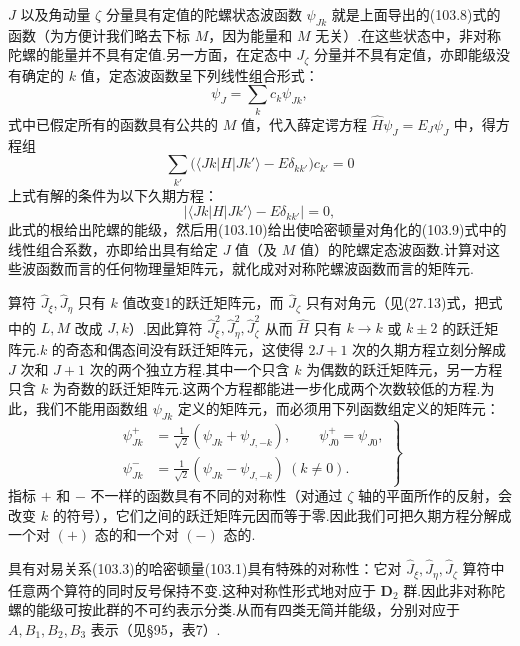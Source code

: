 $J$ 以及角动量 $\zeta$ 分量具有定值的陀螺状态波函数 $\psi_{Jk}$ 就是上面导出的(103.8)式的函数（为方便计我们略去下标 $M$，因为能量和 $M$ 无关）.在这些状态中，非对称陀螺的能量并不具有定值.另一方面，在定态中 $J_\zeta$ 分量并不具有定值，亦即能级没有确定的 $k$ 值，定态波函数呈下列线性组合形式：
\begin{equation}
  \psi_J=\sum_k c_k\psi_{Jk},
\end{equation}
式中已假定所有的函数具有公共的 $M$ 值，代入薛定谔方程 $\hat{H}\psi_J=E_J\psi_J$ 中，得方程组
\begin{equation}
  \sum_{k'}\big(\langle Jk|H|Jk'\rangle-E\delta_{kk'}\big)c_{k'}=0
\end{equation}
上式有解的条件为以下久期方程：
\begin{equation}
  \bigl|\langle Jk|H|Jk'\rangle-E\delta_{kk'}\bigr|=0,
\end{equation}
此式的根给出陀螺的能级，然后用(103.10)给出使哈密顿量对角化的(103.9)式中的线性组合系数，亦即给出具有给定 $J$ 值（及 $M$ 值）的陀螺定态波函数.计算对这些波函数而言的任何物理量矩阵元，就化成对对称陀螺波函数而言的矩阵元.

算符 $\hat{J}_\xi,\hat{J}_\eta$ 只有 $k$ 值改变1的跃迁矩阵元，而 $\hat{J}_\zeta$ 只有对角元（见(27.13)式，把式中的 $L,M$ 改成 $J,k$）.因此算符 $\hat{J}_\xi^2,\hat{J}_\eta^2,\hat{J}_\zeta^2$ 从而 $\hat{H}$ 只有 $k\rightarrow k$ 或 $k\pm2$ 的跃迁矩阵元.$k$ 的奇态和偶态间没有跃迁矩阵元，这使得 $2J+1$ 次的久期方程立刻分解成 $J$ 次和 $J+1$ 次的两个独立方程.其中一个只含 $k$ 为偶数的跃迁矩阵元，另一方程只含 $k$ 为奇数的跃迁矩阵元.这两个方程都能进一步化成两个次数较低的方程.为此，我们不能用函数组 $\psi_{Jk}$ 定义的矩阵元，而必须用下列函数组定义的矩阵元：
\begin{equation}
\left.\begin{aligned}
  \psi^+_{Jk}&=\frac{1}{\sqrt{2}}\left(\psi_{Jk}+\psi_{J,-k}\right),
  \qquad\psi^+_{J0}=\psi_{J0},\\
  \psi^-_{Jk}&=\frac{1}{\sqrt{2}}\left(\psi_{Jk}-\psi_{J,-k}\right)\ (k\neq0).
\end{aligned}\right\}
\end{equation}
指标 $+$ 和 $-$ 不一样的函数具有不同的对称性（对通过 $\zeta$ 轴的平面所作的反射，会改变 $k$ 的符号），它们之间的跃迁矩阵元因而等于零.因此我们可把久期方程分解成一个对 $(+)$ 态的和一个对 $(-)$ 态的.

具有对易关系(103.3)的哈密顿量(103.1)具有特殊的对称性：它对 $\hat{J}_\xi,\hat{J}_\eta,\hat{J}_\zeta$ 算符中任意两个算符的同时反号保持不变.这种对称性形式地对应于 $\boldsymbol{D}_2$ 群.因此非对称陀螺的能级可按此群的不可约表示分类.从而有四类无简并能级，分别对应于 $A,B_1,B_2,B_3$ 表示（见§95，表7）.

